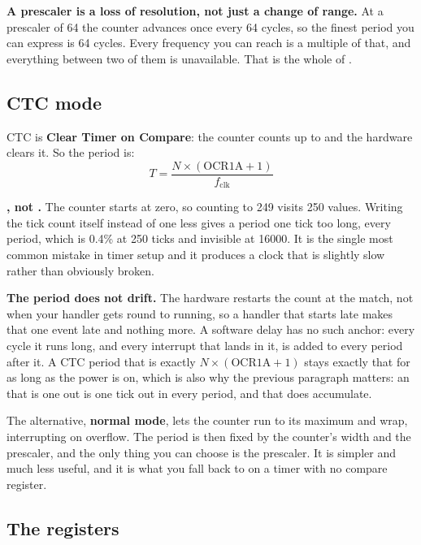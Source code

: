 \textbf{A prescaler is a loss of resolution, not just a change of range.} At a prescaler of 64 the
counter advances once every 64 cycles, so the finest period you can express is 64 cycles. Every
frequency you can reach is a multiple of that, and everything between two of them is unavailable.
That is the whole of .

\subsection{CTC mode}
\label{c5:sec:ctc}


CTC is \textbf{Clear Timer on Compare}: the counter counts up to  and the hardware
clears it. So the period is:
\[
  T = \frac{N \times (\mathrm{OCR1A} + 1)}{f_{\mathrm{clk}}}
\]

\textbf{, not .} The counter starts at zero, so counting to 249 visits
250 values. Writing the tick count itself instead of one less gives a period one tick too long,
every period, which is 0.4\% at 250 ticks and invisible at 16000. It is the single most common
mistake in timer setup and it produces a clock that is slightly slow rather than obviously broken.

\textbf{The period does not drift.} The hardware restarts the count at the match, not when your
handler gets round to running, so a handler that starts late makes that one event late and nothing
more. A software delay has no such anchor: every cycle it runs long, and every interrupt that lands
in it, is added to every period after it. A CTC period that is exactly
$N \times (\mathrm{OCR1A} + 1)$ stays exactly that for as long as the power is on, which is also
why the previous paragraph matters: an  that is one out is one tick out in every
period, and that does accumulate.

The alternative, \textbf{normal mode}, lets the counter run to its maximum and wrap, interrupting
on overflow. The period is then fixed by the counter's width and the prescaler, and the only thing
you can choose is the prescaler. It is simpler and much less useful, and it is what you fall back
to on a timer with no compare register.

\subsection{The registers}
\label{c5:sec:registers}

